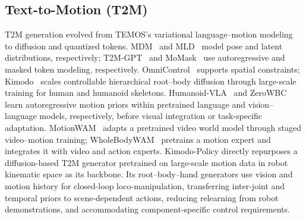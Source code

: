 \subsection{Text-to-Motion (T2M)}
T2M generation evolved from TEMOS's variational language--motion modeling~\cite{temos} to diffusion and quantized tokens. MDM~\cite{mdm} and MLD~\cite{mld} model pose and latent distributions, respectively; T2M-GPT~\cite{t2mgpt} and MoMask~\cite{momask} use autoregressive and masked token modeling, respectively. OmniControl~\cite{omnicontrol} supports spatial constraints; Kimodo~\cite{kimodo} scales controllable hierarchical root--body diffusion through large-scale training for human and humanoid skeletons. Humanoid-VLA~\cite{humanoidvla} and ZeroWBC~\cite{zerowbc} learn autoregressive motion priors within pretrained language and vision--language models, respectively, before visual integration or task-specific adaptation. MotionWAM~\cite{motionwam} adapts a pretrained video world model through staged video--motion training; WholeBodyWAM~\cite{wholebodywam_motionpriors} pretrains a motion expert and integrates it with video and action experts. Kimodo-Policy directly repurposes a diffusion-based T2M generator pretrained on large-scale motion data in robot kinematic space as its backbone. Its root--body--hand generators use vision and motion history for closed-loop loco-manipulation, transferring inter-joint and temporal priors to scene-dependent actions, reducing relearning from robot demonstrations, and accommodating component-specific control requirements.
